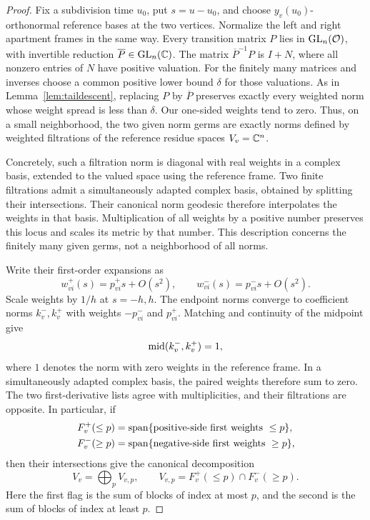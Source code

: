 \begin{proof}
Fix a subdivision time $u_0$, put $s=u-u_0$, and choose
$y_v(u_0)$-orthonormal reference bases at the two vertices.
Normalize the left and right apartment frames in the same way.
Every transition matrix $P$ lies in $\operatorname{GL}_n(\mathcal O)$, with
invertible reduction $\overline P\in\operatorname{GL}_n(\mathbb C)$.
The matrix $\overline P^{-1}P$ is $I+N$, where all nonzero
entries of $N$ have positive valuation. For the finitely many
matrices and inverses choose a common positive lower bound
$\delta$ for those valuations. As in
Lemma~\ref{lem:taildescent}, replacing $P$ by $\overline P$
preserves exactly every weighted norm whose weight spread is
less than $\delta$. Our one-sided weights tend to zero.
Thus, on a small neighborhood, the two given norm germs are
exactly norms defined by weighted filtrations of the reference
residue spaces $V_v=\mathbb C^n$.

Concretely, such a filtration norm is diagonal with real weights
in a complex basis, extended to the valued space using the
reference frame. Two finite filtrations admit a simultaneously
adapted complex basis, obtained by splitting their intersections.
Their canonical norm geodesic therefore interpolates the weights
in that basis. Multiplication of all weights by a positive
number preserves this locus and scales its metric by that number.
This description concerns the finitely many given germs, not a
neighborhood of all norms.

Write their first-order expansions as
\[
 w_{vi}^+(s)=p_{vi}^+s+O(s^2),\qquad
 w_{vi}^-(s)=p_{vi}^-s+O(s^2).
\]
Scale weights by $1/h$ at $s=-h,h$. The endpoint norms converge
to coefficient norms $k_v^-,k_v^+$ with weights $-p_{vi}^-$
and $p_{vi}^+$. Matching and continuity of the midpoint give
\begin{equation}\label{eq:oppositefirstgerms}
 \operatorname{mid}(k_v^-,k_v^+)=1,
\end{equation}
where $1$ denotes the norm with zero weights in the reference
frame. In a simultaneously adapted complex basis, the paired
weights therefore sum to zero. The two first-derivative lists
agree with multiplicities, and their filtrations are opposite.
In particular, if
\[
 \begin{aligned}
 F_v^+(\le p)&=\operatorname{span}\{\hbox{positive-side first weights }\le p\},\\
 F_v^-(\ge p)&=\operatorname{span}\{\hbox{negative-side first weights }\ge p\},
 \end{aligned}
\]
then their intersections give the canonical decomposition
\begin{equation}\label{eq:vertexdecomposition}
 V_v=\bigoplus_p V_{v,p},\qquad
 V_{v,p}=F_v^+(\le p)\cap F_v^-(\ge p).
\end{equation}
Here the first flag is the sum of blocks of index at most $p$,
and the second is the sum of blocks of index at least $p$.


\end{proof}

